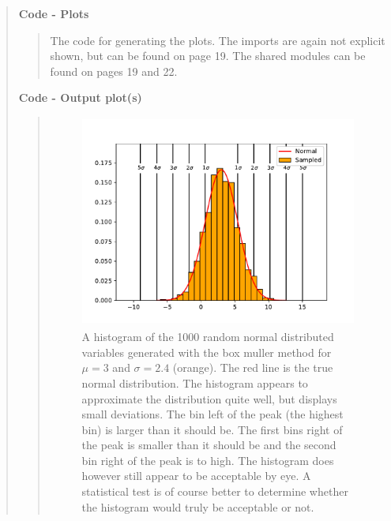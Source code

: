 \begin{quote}
\begin{quote}
\end{quote}

\textbf{Code - Plots}

\begin{quote}
The code for generating the plots. The imports are again not explicit shown, but can be found on page 19. The shared modules can be found on pages 19 and 22. 



\end{quote}


\textbf{Code - Output plot(s)}
\vspace*{-0.5cm}
\begin{quote}
\begin{figure}[!hb]
\centering
\includegraphics[width=13cm, height=7.0cm]{./Plots/1_hist_gaussian.pdf}
\caption{A histogram of the 1000 random normal distributed variables generated with the box muller method for $\mu = 3$ and $\sigma = 2.4$  (orange). The red line is the true normal distribution.  The histogram appears to approximate the distribution quite well, but displays small deviations. The bin left of the peak (the highest bin) is larger than it should be. The first bins right of the peak is smaller than it should be and the second bin right of the peak is to high.  The histogram does however still appear to be acceptable by eye. A statistical test is of course better to determine whether the histogram would truly be acceptable or not.}
\label{fig:normal}
\end{figure}
\end{quote}
\end{quote}

%

